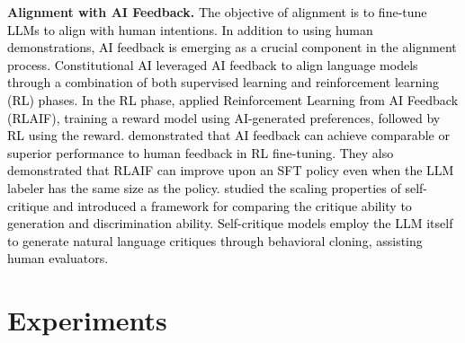 \documentclass{article}
\def\CC{\textcolor{black}}
\begin{document}
\noindent\textbf{Alignment with AI Feedback.} 
\CC{The objective of alignment is to fine-tune LLMs to align with human intentions. 
In addition to using human demonstrations, AI feedback is emerging as a crucial component in the alignment process. 
Constitutional AI \citep{bai2022constitutional} leveraged AI feedback to align language models through a combination of both supervised learning and reinforcement learning (RL) phases. 
In the RL phase, \citep{bai2022constitutional} applied Reinforcement Learning from AI Feedback (RLAIF), training a reward model using AI-generated preferences, followed by RL using the reward. 
\citet{lee2023rlaif} demonstrated that AI feedback can achieve comparable or superior performance to human feedback in RL fine-tuning. 
They also demonstrated that RLAIF can improve upon an SFT policy even when the LLM labeler has the same size as the policy. 
\citet{saunders2022self} studied the scaling properties of self-critique and introduced a framework for comparing the critique ability to generation and discrimination ability. 
Self-critique models employ the LLM itself to generate natural language critiques through behavioral cloning, assisting human evaluators. }








\section{Experiments}\label{app:exp}
\end{document}
